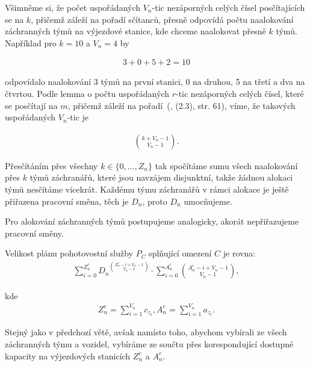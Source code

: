 \begin{dukaz}
  Všimněme si, že počet uspořádaných $V_n$-tic nezáporných celých čísel posčítajících se na $k$,
  přičemž záleží na pořadí sčítanců, přesně odpovídá počtu naalokování záchranných týmů na výjezdové stanice, kde chceme naalokovat přesně $k$ týmů.
  Například pro $k = 10$ a $V_n = 4$ by

  \begin{align*}
    3 + 0 + 5 + 2 = 10
  \end{align*}

  odpovídalo naalokování 3 týmů na první stanici, 0 na druhou, 5 na třetí a dva na čtvrtou.
  Podle lemma o počtu uspořádaných $r$-tic nezáporných celých čísel, které se posčítají na $m$, přičemž záleží na pořadí~(\citet{Diskretka}, (2.3), str. 61),
  víme, že takových uspořádaných $V_n$-tic je

  \begin{align}
    \binom{k + V_n - 1}{V_n - 1}.
  \end{align}

  Přesčítáním přes všechny $k \in \{ 0, \dots, Z_n \}$ tak spočítáme sumu všech naalokování přes $k$ týmů záchranářů, které jsou navzájem disjunktní, takže žádnou alokaci týmů nesčítáme vícekrát.
  Každému týmu záchranářů v rámci alokace je ještě přiřazena pracovní směna, těch je $D_n$, proto $D_n$ umocňujeme. 

  Pro alokování záchranných týmů postupujeme analogicky, akorát nepřiřazujeme pracovní směny.
\end{dukaz}

\begin{veta}
  Velikost plánu pohotovostní služby $P_C$ splňující omezení $C$ je rovna:
  \begin{align*}
    \sum_{i=0}^{Z^c_n}{{D_n}^{\binom{Z^c_n - i + V_n - 1}{V_n - 1}}} \cdot \sum_{i = 0}^{A^c_n}\binom{A^c_n - i + V_n - 1}{V_n - 1},
  \end{align*}

  kde
  \begin{align*}
    Z^c_n = \sum_{i=1}^{V_n} c_{z_{i}}, A^c_n = \sum_{i=1}^{V_n} a_{z_{i}}.
  \end{align*}
\end{veta}

\begin{dukaz}
  Stejný jako v předchozí větě, avšak namísto toho, abychom vybírali ze všech záchranných týmu a vozidel,
  vybíráme ze součtu přes korespondující dostupné kapacity na výjezdových stanicích $Z^c_n$ a $A^c_n$.
\end{dukaz}

